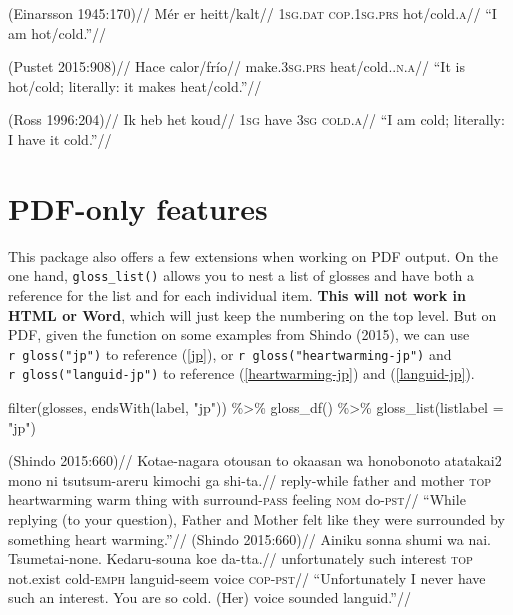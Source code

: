 \documentclass[
  letterpaper,
  DIV=11,
  numbers=noendperiod]{scrartcl}
\newenvironment{Shaded}{\begin{snugshade}}{\end{snugshade}}
\newcommand{\AttributeTok}[1]{\textcolor[rgb]{0.40,0.45,0.13}{#1}}
\newcommand{\FunctionTok}[1]{\textcolor[rgb]{0.28,0.35,0.67}{#1}}
\newcommand{\NormalTok}[1]{\textcolor[rgb]{0.00,0.23,0.31}{#1}}
\newcommand{\SpecialCharTok}[1]{\textcolor[rgb]{0.37,0.37,0.37}{#1}}
\newcommand{\StringTok}[1]{\textcolor[rgb]{0.13,0.47,0.30}{#1}}
\begin{document}
\ex\label{feel-icelandic} \begingl \glpreamble (Einarsson 1945:170)//
\gla Mér er heitt/kalt// \glb \textsc{1sg.dat} \textsc{cop.1sg.prs}
hot/cold.\textsc{a}// \glft ``I am hot/cold.''// \endgl \xe

\ex\label{amb-spanish} \begingl \glpreamble (Pustet 2015:908)//
\gla Hace calor/frío// \glb make.\textsc{3sg.prs}
heat/cold.\textsc{.n.a}// \glft ``It is hot/cold; literally: it makes
heat/cold.''// \endgl \xe

\ex\label{feel-dutch} \begingl \glpreamble (Ross 1996:204)// \gla Ik heb
het koud// \glb \textsc{1sg} have \textsc{3sg} \textsc{cold.a}//
\glft ``I am cold; literally: I have it cold.''// \endgl \xe

\hypertarget{pdf-only-features}{%
\section{PDF-only features}\label{pdf-only-features}}

This package also offers a few extensions when working on PDF output. On
the one hand, \texttt{gloss\_list()} allows you to nest a list of
glosses and have both a reference for the list and for each individual
item. \textbf{This will not work in HTML or Word}, which will just keep
the numbering on the top level. But on PDF, given the function on some
examples from Shindo (2015), we can use
\texttt{\textasciigrave{}r\ gloss("jp")\textasciigrave{}} to reference
(\ref{jp}), or
\texttt{\textasciigrave{}r\ gloss("heartwarming-jp")\textasciigrave{}}
and \texttt{\textasciigrave{}r\ gloss("languid-jp")\textasciigrave{}} to
reference (\ref{heartwarming-jp}) and (\ref{languid-jp}).

\begin{Shaded}
\begin{Highlighting}[]
\FunctionTok{filter}\NormalTok{(glosses, }\FunctionTok{endsWith}\NormalTok{(label, }\StringTok{"jp"}\NormalTok{)) }\SpecialCharTok{\%\textgreater{}\%} 
  \FunctionTok{gloss\_df}\NormalTok{() }\SpecialCharTok{\%\textgreater{}\%} 
  \FunctionTok{gloss\_list}\NormalTok{(}\AttributeTok{listlabel =} \StringTok{"jp"}\NormalTok{)}
\end{Highlighting}
\end{Shaded}


\pex\label{jp} \a\label{heartwarming-jp} \begingl \glpreamble (Shindo
2015:660)// \gla Kotae-nagara otousan to okaasan wa honobonoto atatakai2
mono ni tsutsum-areru kimochi ga shi-ta.// \glb reply-while father and
mother \textsc{top} heartwarming warm thing with surround-\textsc{pass}
feeling \textsc{nom} do-\textsc{pst}// \glft ``While replying (to your
question), Father and Mother felt like they were surrounded by something
heart warming.''// \endgl  \a\label{languid-jp}
\begingl \glpreamble (Shindo 2015:660)// \gla Ainiku sonna shumi wa nai.
Tsumetai-none. Kedaru-souna koe da-tta.// \glb unfortunately such
interest \textsc{top} not.exist cold-\textsc{emph} languid-seem voice
\textsc{cop-pst}// \glft ``Unfortunately I never have such an interest.
You are so cold. (Her) voice sounded languid.''// \endgl  \xe
\end{document}
